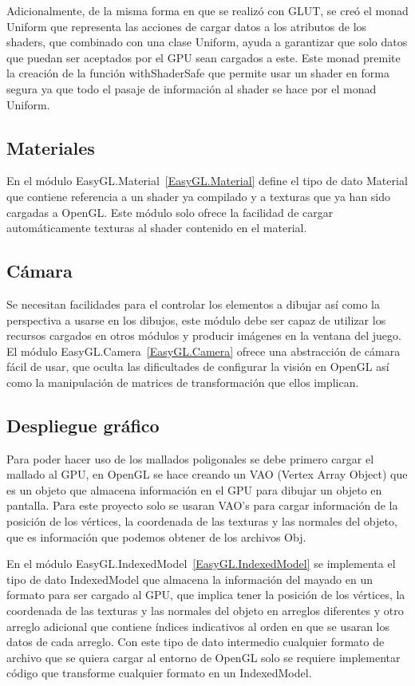 Adicionalmente, de la misma forma en que se realizó con GLUT,  se creó el monad Uniform que representa las acciones de cargar datos a los atributos de los shaders, que combinado con una clase Uniform, ayuda a garantizar que solo datos que puedan ser aceptados por el GPU sean cargados a este. Este monad premite la creación de la función withShaderSafe que permite usar un shader en forma segura ya que todo el pasaje de información al shader se hace por el monad Uniform.

\subsection{Materiales}

En el módulo EasyGL.Material~\ref{EasyGL.Material} define el tipo de dato Material que contiene referencia a un shader ya compilado y a texturas que ya han sido cargadas a OpenGL. Este módulo solo ofrece la facilidad de cargar automáticamente texturas al shader contenido en el material.

\subsection{Cámara}

Se necesitan facilidades para el controlar los elementos a dibujar así como la perspectiva a usarse en los dibujos, este módulo debe ser capaz de utilizar los recursos cargados en otros módulos y producir imágenes en la ventana del juego. El módulo EasyGL.Camera~\ref{EasyGL.Camera} ofrece una abstracción de cámara fácil de usar, que oculta las dificultades de configurar la visión en OpenGL así como la manipulación de matrices de transformación que ellos implican.

\subsection{Despliegue gráfico}

Para poder hacer uso de los mallados poligonales se debe primero cargar el mallado al GPU, en OpenGL se hace creando un VAO (Vertex Array Object) que es un objeto que almacena información en el GPU para dibujar un objeto en pantalla. Para este proyecto solo se usaran VAO’s para cargar información de la posición de los vértices, la coordenada de las texturas y las normales del objeto, que es información que podemos obtener de los archivos Obj.

En el módulo EasyGL.IndexedModel~\ref{EasyGL.IndexedModel} se implementa el tipo de dato IndexedModel que almacena la información del mayado en un formato para ser cargado al GPU, que implica tener la posición de los vértices, la coordenada de las texturas y las normales del objeto en arreglos diferentes y otro arreglo adicional que contiene índices indicativos al orden en que se usaran los datos de cada arreglo. Con este tipo de dato intermedio cualquier formato de archivo que se quiera cargar al entorno de OpenGL solo se requiere implementar código que transforme cualquier formato en un IndexedModel.

